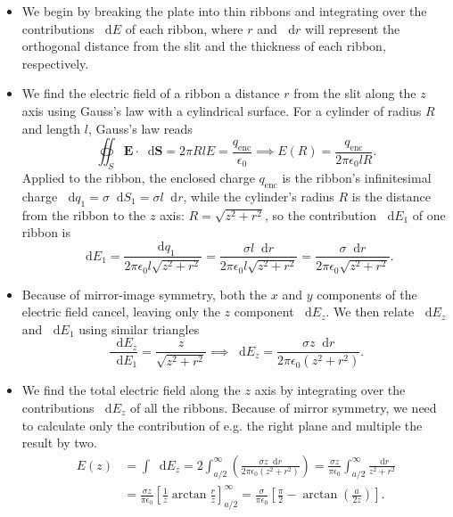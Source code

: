 \documentclass[11pt, a4paper]{article}
\newcommand{\diff}{\mathop{}\!\mathrm{d}} %
\renewcommand{\vec}[1]{\bm{#1}} %
\newcommand{\ee}{\epsilon_{0}}  %
\begin{document}
\begin{itemize}
	\item We begin by breaking the plate into thin ribbons and integrating over the contributions $ \diff E $ of each ribbon, where $ r $ and $ \diff r $ will represent the orthogonal distance from the slit and the thickness of each ribbon, respectively.
	
	\item We find the electric field of a ribbon a distance $ r $ from the slit along the $ z $ axis using Gauss's law with a cylindrical surface. For a cylinder of radius $ R $ and length $ l $, Gauss's law reads
	\begin{equation*}
		\oiint_{S} \vec{E} \cdot \diff \vec{S} = 2\pi R l E = \frac{q_{\text{enc}}}{\ee} \implies E(R) = \frac{q_{\text{enc}}}{2\pi \ee l R}.
	\end{equation*}
	Applied to the ribbon, the enclosed charge $ q_{\text{enc}} $ is the ribbon's infinitesimal charge $ \diff q_{1} = \sigma \diff S_{1} = \sigma l \diff r $, while the cylinder's radius $ R $ is the distance from the ribbon to the $ z $ axis: $ R = \sqrt{z^{2} + r^{2}} $, so the contribution $ \diff E_{1} $ of one ribbon is
	\begin{equation*}
		\diff E_{1} = \frac{\diff q_{1}}{2\pi \ee l \sqrt{z^{2} + r^{2}}} = \frac{\sigma l \diff r}{2\pi \ee l\sqrt{z^{2} + r^{2}} } = \frac{\sigma \diff r}{2\pi \ee \sqrt{z^{2} + r^{2}} }.
	\end{equation*}
	
	\item Because of mirror-image symmetry, both the $ x $ and $ y $ components of the electric field cancel, leaving only the $ z $ component $ \diff E_{z} $. We then relate $ \diff E_{z} $ and $ \diff E_{1} $ using similar triangles
	\begin{equation*}
		\frac{\diff E_{z}}{\diff E_{1}} = \frac{z}{\sqrt{z^{2} + r^{2}}} \implies  \diff E_{z} = \frac{\sigma z \diff r}{2\pi \ee (z^{2} + r^{2})}.
	\end{equation*}
	
	\item We find the total electric field along the $ z $ axis by integrating over the contributions $ \diff E_{z} $ of all the ribbons. Because of mirror symmetry, we need to calculate only the contribution of e.g. the right plane and multiple the result by two.
	\begin{align*}
		E(z) &= \int \diff E_{z} = 2 \int_{a/2}^{\infty} \left(\frac{\sigma z \diff r}{2\pi \ee (z^{2} + r^{2})}\right) = \frac{\sigma z}{\pi \ee} \int_{a/2}^{\infty} \frac{\diff r}{z^{2} + r^{2}}\\
		&= \frac{\sigma z}{\pi \ee} \left[\frac{1}{z}\arctan \frac{r}{z}\right]_{a/2}^{\infty} = \frac{\sigma}{\pi \ee} \left[\frac{\pi}{2} - \arctan(\frac{a}{2z})\right].
	\end{align*}
	

\end{itemize}
\end{document}
